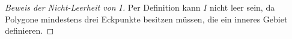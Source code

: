 \begin{proof}[Beweis der Nicht-Leerheit von $I$\label{jordan:beweis:nicht_leerheit_innen}]
    Per Definition kann $I$ nicht leer sein, da Polygone mindestens drei Eckpunkte besitzen müssen, die ein inneres Gebiet definieren. 
\end{proof}